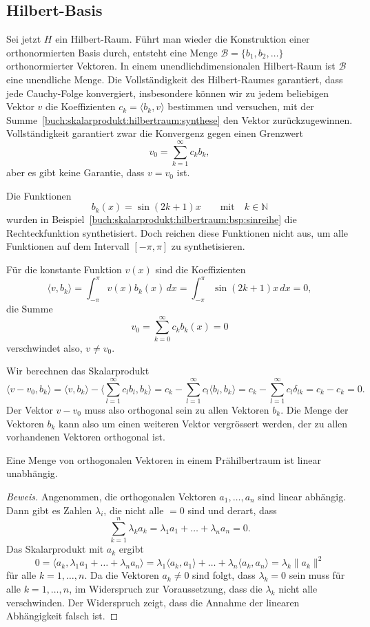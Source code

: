 %
%
\subsection{Hilbert-Basis}
Sei jetzt $H$ ein Hilbert-Raum.
Führt man wieder die Konstruktion einer orthonormierten Basis durch,
entsteht eine Menge $\mathcal{B}=\{b_1,b_2,\dots\}$ orthonormierter
Vektoren.
In einem unendlichdimensionalen Hilbert-Raum ist $\mathcal{B}$ eine
unendliche Menge.
Die Vollständigkeit des Hilbert-Raumes garantiert, dass jede
Cauchy-Folge konvergiert, insbesondere können wir zu jedem beliebigen
Vektor $v$ die Koeffizienten $c_k=\langle b_k,v \rangle$ bestimmen
und versuchen, mit der
Summe~\eqref{buch:skalarprodukt:hilbertraum:synthese}
den Vektor zurückzugewinnen.
Vollständigkeit garantiert zwar die Konvergenz gegen einen Grenzwert
\[
v_0 = \sum_{k=1}^\infty c_k b_k,
\]
aber es gibt keine Garantie, dass $v=v_0$ ist.

\begin{beispiel}
Die Funktionen
\[
b_k(x) = \sin (2k+1)x
\qquad\text{mit}\quad
k\in \mathbb{N}
\]
wurden in Beispiel~\ref{buch:skalarprodukt:hilbertraum:bsp:sinreihe}
die Rechteckfunktion synthetisiert.
Doch reichen diese Funktionen nicht aus, um alle Funktionen auf
dem Intervall $[-\pi,\pi]$ zu synthetisieren.

Für die konstante Funktion $v(x)$ sind die Koeffizienten
\[
\langle v,b_k\rangle
=
\int_{-\pi}^\pi v(x)b_k(x)\,dx
=
\int_{-\pi}^\pi \sin (2k+1)x\,dx
=
0,
\]
die Summe
\[
v_0
=
\sum_{k=0}^\infty
c_k
b_k(x)
=
0
\]
verschwindet also, $v\ne v_0$.
\end{beispiel}

Wir berechnen das Skalarprodukt 
\[
\langle v-v_0,b_k\rangle
=
\langle v,b_k\rangle
-
\biggl\langle \sum_{l=1}^\infty c_lb_l,b_k\biggr\rangle
=
c_k - \sum_{l=1}^\infty c_l\langle b_l,b_k\rangle
=
c_k - \sum_{l=1}^\infty c_l\delta_{lk}
=
c_k-c_k=0.
\]
Der Vektor $v-v_0$ muss also orthogonal sein zu allen Vektoren
$b_k$.
Die Menge der Vektoren $b_k$ kann also um einen weiteren Vektor
vergrössert werden, der zu allen vorhandenen Vektoren orthogonal ist.

\begin{satz}
Eine Menge von orthogonalen Vektoren in einem Prähilbertraum ist linear 
unabhängig.
\end{satz}

\begin{proof}[Beweis]
Angenommen, die orthogonalen Vektoren  $a_1,\dots,a_n$ sind linear
abhängig.
Dann gibt es Zahlen $\lambda_i$, die nicht alle $=0$ sind und derart,
dass
\[
\sum_{k=1}^n \lambda_ka_k
=
\lambda_1 a_1 + \ldots + \lambda_n a_n
=
0.
\]
Das Skalarprodukt mit $a_k$ ergibt
\[
0
=
\langle a_k,\lambda_1a_1 +\ldots + \lambda_na_n\rangle
=
\lambda_1
\langle a_k,a_1\rangle
+
\ldots
+
\lambda_n
\langle a_k,a_n\rangle
=
\lambda_k \|a_k\|^2
\]
für alle $k=1,\dots,n$.
Da die Vektoren $a_k\ne 0$ sind folgt, dass $\lambda_k=0$ sein muss
für alle $k=1,\dots,n$, im Widerspruch zur Voraussetzung, dass die
$\lambda_k$ nicht alle verschwinden.
Der Widerspruch zeigt, dass die Annahme der linearen Abhängigkeit
falsch ist.
\end{proof}

